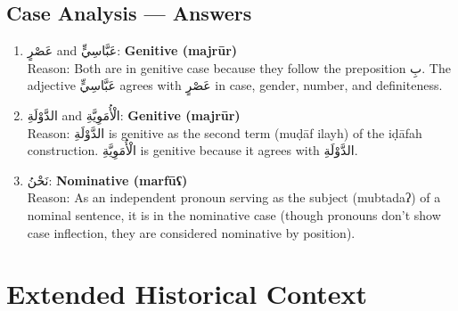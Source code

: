 \documentclass[letterpaper,12pt]{article}
\begin{document}
\subsection{Case Analysis — Answers}

\begin{enumerate}
\item \textarabic{عَصْرٍ} and \textarabic{عَبَّاسِيٍّ}: \textbf{Genitive (majrūr)}\\
Reason: Both are in genitive case because they follow the preposition \textarabic{بِ}. The adjective \textarabic{عَبَّاسِيٍّ} agrees with \textarabic{عَصْرٍ} in case, gender, number, and definiteness.

\item \textarabic{الدَّوْلَةِ} and \textarabic{الْأُمَوِيَّةِ}: \textbf{Genitive (majrūr)}\\
Reason: \textarabic{الدَّوْلَةِ} is genitive as the second term (muḍāf ilayh) of the iḍāfah construction. \textarabic{الْأُمَوِيَّةِ} is genitive because it agrees with \textarabic{الدَّوْلَةِ}.

\item \textarabic{نَحْنُ}: \textbf{Nominative (marfūʕ)}\\
Reason: As an independent pronoun serving as the subject (mubtadaʔ) of a nominal sentence, it is in the nominative case (though pronouns don't show case inflection, they are considered nominative by position).
\end{enumerate}

\section{Extended Historical Context}
\end{document}
